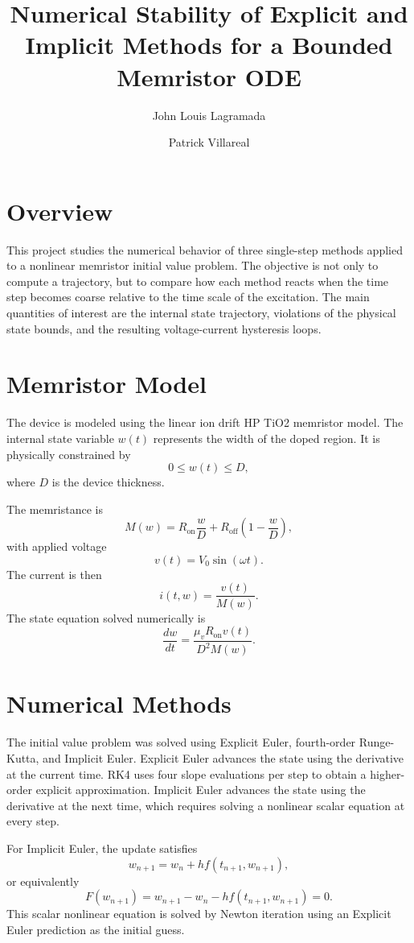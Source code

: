 \documentclass[11pt]{article}
\title{Numerical Stability of Explicit and Implicit Methods for a Bounded Memristor ODE}
\author{John Louis Lagramada \and Patrick Villareal}
\date{}
\begin{document}
\maketitle

\section{Overview}

This project studies the numerical behavior of three single-step methods applied to a nonlinear memristor initial value problem. The objective is not only to compute a trajectory, but to compare how each method reacts when the time step becomes coarse relative to the time scale of the excitation. The main quantities of interest are the internal state trajectory, violations of the physical state bounds, and the resulting voltage-current hysteresis loops.

\section{Memristor Model}

The device is modeled using the linear ion drift HP TiO2 memristor model. The internal state variable \(w(t)\) represents the width of the doped region. It is physically constrained by
\[
0 \leq w(t) \leq D,
\]
where \(D\) is the device thickness.

The memristance is
\[
M(w) = R_{\text{on}}\frac{w}{D}
       + R_{\text{off}}\left(1-\frac{w}{D}\right),
\]
with applied voltage
\[
v(t) = V_0 \sin(\omega t).
\]
The current is then
\[
i(t,w) = \frac{v(t)}{M(w)}.
\]
The state equation solved numerically is
\[
\frac{dw}{dt}
=
\frac{\mu_v R_{\text{on}} v(t)}{D^2 M(w)}.
\]

\section{Numerical Methods}

The initial value problem was solved using Explicit Euler, fourth-order Runge-Kutta, and Implicit Euler. Explicit Euler advances the state using the derivative at the current time. RK4 uses four slope evaluations per step to obtain a higher-order explicit approximation. Implicit Euler advances the state using the derivative at the next time, which requires solving a nonlinear scalar equation at every step.

For Implicit Euler, the update satisfies
\[
w_{n+1} = w_n + h f(t_{n+1}, w_{n+1}),
\]
or equivalently
\[
F(w_{n+1}) = w_{n+1} - w_n - h f(t_{n+1}, w_{n+1}) = 0.
\]
This scalar nonlinear equation is solved by Newton iteration using an Explicit Euler prediction as the initial guess.
\end{document}
